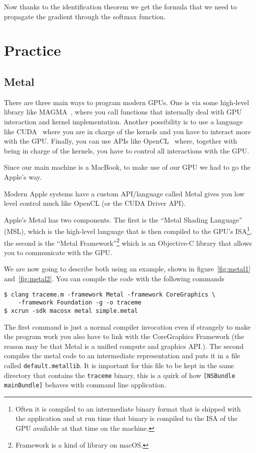 \documentclass{sapthesis}
\begin{document}
Now thanks to the identification theorem we get the formula that we need to
propagate the gradient through the softmax function.

\part{Practice}

\chapter{Metal}

There are three main ways to program modern GPUs. One is via some high-level
library like MAGMA~\cite{tomov2010}, where you call functions that internally deal
with GPU interaction and kernel implementation. Another possibility is to use a
language like CUDA~\cite{nickolls2008} where you are in charge of the kernels and you
have to interact more with the GPU. Finally, you can use APIs like
OpenCL~\cite{stone2010} where, together with being in charge of the kernels, you
have to control all interactions with the GPU.

Since our main machine is a MacBook, to make use of our GPU we had to go the
Apple's way.

Modern Apple systems have a custom API/language called Metal gives you low
level control much like OpenCL (or the CUDA Driver API).

Apple's Metal has two components. The first is the ``Metal Shading Language''
(MSL), which is the high-level language that is then compiled to the GPU's
ISA\footnote{Often it is compiled to an intermediate binary format that is
shipped with the application and at run time that binary is compiled to the ISA
of the GPU available at that time on the machine.}, the second is the ``Metal
Framework''\footnote{Framework is a kind of library on macOS.} which is an
Objective-C library that allows you to communicate with the GPU.

We are now going to describe both using an example, shown in
figure~\ref{fig:metal1} and~\ref{fig:metal2}. You can compile the code
with the following commands
\begin{verbatim}
$ clang traceme.m -framework Metal -framework CoreGraphics \
    -framework Foundation -g -o traceme
$ xcrun -sdk macosx metal simple.metal
\end{verbatim}

The first command is just a normal compiler invocation even if strangely to make
the program work you also have to link with the CoreGraphics Framework (the
reason may be that Metal is a unified compute and graphics API.). The second
compiles the metal code to an intermediate representation and puts it in a file
called \texttt{default.metallib}. It is important for this file to be kept in
the same directory that contains the \texttt{traceme} binary, this is a quirk of
how \texttt{[NSBundle mainBundle]} behaves with command line application.
\end{document}
